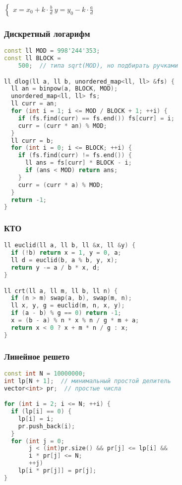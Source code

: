 \documentclass[10pt,a4paper,landscape,twosided]{extarticle}
\begin{document}
\begin{multicols}{3}
$\begin{cases}x = x_{0} + k\cdot\frac{b}{ d }\ y = y_{0} - k\cdot\frac{a}{ d }\end
{ cases }$

\subsubsection{Дискретный логарифм}
\begin{lstlisting}[language=C++]
const ll MOD = 998'244'353;
const ll BLOCK =
    500;  // типа sqrt(MOD), но подбирать ручками

ll dlog(ll a, ll b, unordered_map<ll, ll> &fs) {
  ll an = binpow(a, BLOCK, MOD);
  unordered_map<ll, ll> fs;
  ll curr = an;
  for (int i = 1; i <= MOD / BLOCK + 1; ++i) {
    if (fs.find(curr) == fs.end()) fs[curr] = i;
    curr = (curr * an) % MOD;
  }
  ll curr = b;
  for (int i = 0; i <= BLOCK; ++i) {
    if (fs.find(curr) != fs.end()) {
      ll ans = fs[curr] * BLOCK - i;
      if (ans < MOD) return ans;
    }
    curr = (curr * a) % MOD;
  }
  return -1;
}
\end{lstlisting}

\subsubsection{КТО}
\begin{lstlisting}[language=C++]
ll euclid(ll a, ll b, ll &x, ll &y) {
  if (!b) return x = 1, y = 0, a;
  ll d = euclid(b, a % b, y, x);
  return y -= a / b * x, d;
}

ll crt(ll a, ll m, ll b, ll n) {
  if (n > m) swap(a, b), swap(m, n);
  ll x, y, g = euclid(m, n, x, y);
  if (a - b) % g == 0) return -1;
  x = (b - a) % n * x % n / g * m + a;
  return x < 0 ? x + m * n / g : x;
}\end{lstlisting}

\subsubsection{Линейное решето}
\begin{lstlisting}[language=C++]
const int N = 10000000;
int lp[N + 1];  // минимальный простой делитель
vector<int> pr;  // простые числа

for (int i = 2; i <= N; ++i) {
  if (lp[i] == 0) {
    lp[i] = i;
    pr.push_back(i);
  }
  for (int j = 0;
       j < (int)pr.size() && pr[j] <= lp[i] &&
       i * pr[j] <= N;
       ++j)
    lp[i * pr[j]] = pr[j];
}
\end{lstlisting}


\end{multicols}
\end{document}
